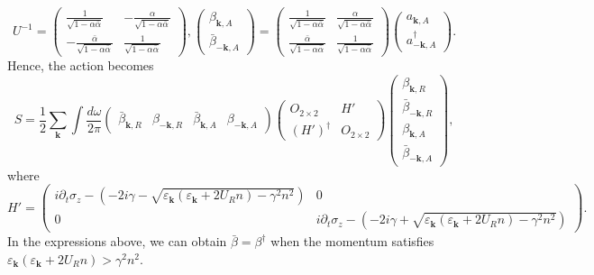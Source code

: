 \documentclass[aps,superscriptaddress,notitlepage,longbibliography]{revtex4-1}
\begin{document}
\begin{equation}
U^{-1}=\left(\begin{array}{cc}
\frac{1}{\sqrt{1-\alpha\bar{\alpha}}} & -\frac{\alpha}{\sqrt{1-\alpha\bar{\alpha}}}\\
-\frac{\bar{\alpha}}{\sqrt{1-\alpha\bar{\alpha}}} & \frac{1}{\sqrt{1-\alpha\bar{\alpha}}}
\end{array}\right),\left(\begin{array}{c}
\beta_{\bm{k},A}\\
\bar{\beta}_{-\bm{k},A}
\end{array}\right)=\left(\begin{array}{cc}
\frac{1}{\sqrt{1-\alpha\bar{\alpha}}} & \frac{\alpha}{\sqrt{1-\alpha\bar{\alpha}}}\\
\frac{\bar{\alpha}}{\sqrt{1-\alpha\bar{\alpha}}} & \frac{1}{\sqrt{1-\alpha\bar{\alpha}}}
\end{array}\right)\left(\begin{array}{c}
a_{\bm{k},A}\\
a_{-\bm{k},A}^{\dagger}
\end{array}\right).
\end{equation}
Hence, the action becomes 
\begin{equation}
S=\frac{1}{2}\sum_{\bm{k}}\int\frac{d\omega}{2\pi}\left(\begin{array}{cccc}
\bar{\beta}_{\bm{k},R} & \beta_{-\bm{k},R} & \bar{\beta}_{\bm{k},A} & \beta_{-\bm{k},A}\end{array}\right)\left(\begin{array}{cc}
O_{2\times2} & H'\\
(H')^{\dagger} & O_{2\times2}
\end{array}\right)\left(\begin{array}{c}
\beta_{\bm{k},R}\\
\bar{\beta}_{-\bm{k},R}\\
\beta_{\bm{k},A}\\
\bar{\beta}_{-\bm{k},A}
\end{array}\right),
\end{equation}
where 
\begin{equation}
H'=\left(\begin{array}{cc}
i\partial_{t}\sigma_{z}-\left(-2i\gamma-\sqrt{\varepsilon_{\bm{k}}(\varepsilon_{\bm{k}}+2U_{R}n)-\gamma^{2}n^{2}}\right) & 0\\
0 & i\partial_{t}\sigma_{z}-\left(-2i\gamma+\sqrt{\varepsilon_{\bm{k}}(\varepsilon_{\bm{k}}+2U_{R}n)-\gamma^{2}n^{2}}\right)
\end{array}\right).
\end{equation}
In the expressions above, we can obtain $\bar{\beta}=\beta^{\dagger}$
when the momentum satisfies $\varepsilon_{\bm{k}}(\varepsilon_{\bm{k}}+2U_{R}n)>\gamma^{2}n^{2}$.
 



\end{document}
